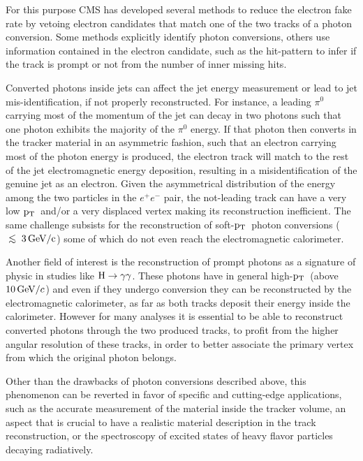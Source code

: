 \documentclass[a4paper]{jpconf}
\def\centeron#1#2{{\setbox0=\hbox{#1}\setbox1=\hbox{#2}\ifdim
\wd1>\wd0\kern.5\wd1\kern-.5\wd0\fi
\copy0\kern-.5\wd0\kern-.5\wd1\copy1\ifdim\wd0>\wd1
\kern.5\wd0\kern-.5\wd1\fi}}
\def\ltap{\;\centeron{\raise.35ex\hbox{$<$}}{\lower.65ex\hbox{$\sim$}}\;}
\def\lsim{\mathrel{\ltap}}
\def \pt{$\p_{\rm T}$~}
\begin{document}
For this purpose 
CMS has developed several methods  to reduce the electron fake rate by  vetoing electron candidates that match one of the two tracks of a photon conversion. Some methods explicitly identify photon conversions, others use information contained in the electron candidate,  such as the hit-pattern to infer if the track is prompt or not from the  number of inner missing hits.

	
Converted photons inside jets can affect  the jet energy measurement or lead to  jet mis-identification, if not properly reconstructed. 
For instance, a leading $\pi^0$ carrying most of the momentum of the jet can decay in two photons such that one photon exhibits the majority of the $\pi^0$ energy. If that photon then converts in the tracker material in an asymmetric fashion, such that an electron carrying most of the photon energy is produced, the electron track will match to the rest of the jet electromagnetic energy deposition, resulting in a misidentification of the genuine jet as an electron.
%
Given the asymmetrical distribution of the energy among the two particles in the $e^+ e^-$ pair, the not-leading track can have a very low \pt and/or a very displaced vertex making its 
 reconstruction inefficient.
 The same challenge subsists for the reconstruction of soft-\pt photon conversions ($\rm \lsim 3 \GeVc$) some of which do not even reach the electromagnetic calorimeter.

Another field of interest is the reconstruction of prompt photons as a signature of  physic in studies like $\rm H \to \gamma \gamma$.
These photons  have in general high-\pt (above $10{\rm \, GeV}/c$) and even if they undergo conversion they can be reconstructed by the electromagnetic calorimeter, as far as both tracks deposit their energy inside the calorimeter.
However for many analyses it is essential to be able to reconstruct  converted photons through the two produced tracks, to profit from the higher angular resolution of these tracks, in order to  better associate the primary vertex from which the original photon belongs.  

Other than the drawbacks of photon conversions described above, this phenomenon can be reverted in favor of specific and cutting-edge applications, such as the accurate measurement of the material inside the tracker volume, an aspect that is crucial to have a realistic  material description in the track reconstruction, or  the spectroscopy of excited states of heavy flavor particles decaying radiatively. 
\end{document}
